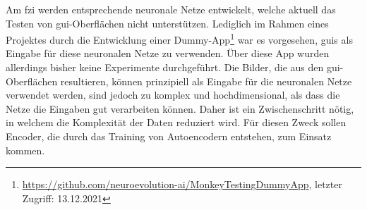 Am \gls{fzi} werden entsprechende neuronale Netze entwickelt, welche aktuell das Testen von \gls{gui}-Oberflächen nicht unterstützen. Lediglich im Rahmen eines Projektes durch die Entwicklung einer Dummy-App\footnote{\url{https://github.com/neuroevolution-ai/MonkeyTestingDummyApp}, letzter Zugriff: 13.12.2021} war es vorgesehen, \glspl{gui} als Eingabe für diese neuronalen Netze zu verwenden. Über diese App wurden allerdings bisher keine Experimente durchgeführt. Die Bilder, die aus den \gls{gui}-Oberflächen resultieren, können prinzipiell als Eingabe für die neuronalen Netze verwendet werden, sind jedoch zu komplex und hochdimensional, als dass die Netze die Eingaben gut verarbeiten können. Daher ist ein Zwischenschritt nötig, in welchem die Komplexität der Daten reduziert wird. Für diesen Zweck sollen Encoder, die durch das Training von Autoencodern entstehen, zum Einsatz kommen.



